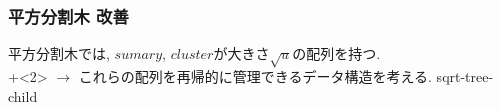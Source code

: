 \documentclass[dvipdfmx,12pt]{standalone}
\begin{document}
\begin{frame}\frametitle{平方分割木 改善}
	平方分割木では, $sumary$, $cluster$が大きさ$\sqrt{u}$の配列を持つ.\\
	\onslide+<2>{
	$\to$ これらの配列を再帰的に管理できるデータ構造を考える.
	{sqrt-tree-child}
}
\end{frame}
\end{document}
